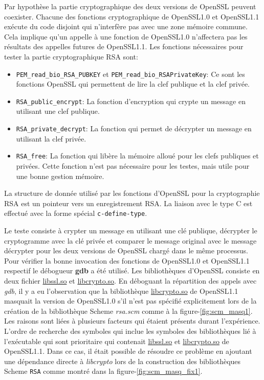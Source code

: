 Par hypothèse la partie cryptographique des deux versions de OpenSSL peuvent
coexister. Chacune des fonctions cryptographique de OpenSSL1.0 et OpenSSL1.1
exécute du code disjoint qui n'interfère pas avec une zone mémoire commune.
Cela implique qu'un appelle à une fonction de OpenSSL1.0 n'affectera pas les
résultats des appelles futures de OpenSSL1.1. Les fonctions nécessaires
pour tester la partie cryptographique RSA sont:
\begin{itemize}
    \item \lstinline{PEM_read_bio_RSA_PUBKEY} et \lstinline{PEM_read_bio_RSAPrivateKey}:
        Ce sont les fonctions OpenSSL qui permettent de lire la clef publique et la clef privée.
    \item \lstinline{RSA_public_encrypt}:
        La fonction d'encryption qui crypte un  message en utilisant une clef publique.
    \item \lstinline{RSA_private_decrypt}:
        La fonction qui permet de décrypter un message en utilisant la clef privée.
    \item \lstinline{RSA_free}:
        La fonction qui libère la mémoire alloué pour les clefs publiques et privées.
        Cette fonction n'est pas nécessaire pour les testes, mais utile pour une bonne
        gestion mémoire.
\end{itemize}
La structure de donnée utilisé par les fonctions d'OpenSSL pour la cryptographie RSA
est un pointeur vers un enregistrement RSA. La liaison avec le type C est effectué avec
la forme spécial \lstinline{c-define-type}.

Le teste consiste à crypter un message en utilisant une clé publique, décrypter le
cryptogramme avec la clé privée et comparer le message original avec le message décrypter
pour les deux versions de OpenSSL chargé dans le même processus. Pour vérifier la bonne
invocation des fonctions de OpenSSL1.0 et OpenSSL1.1 respectif le débogueur \textbf{gdb}
a été utilisé. Les bibliothèques d'OpenSSL consiste en deux fichier \url{libssl.so} et \url{libcrypto.so}.
En déboguant la répartition des appels avec \textit{gdb}, il y a eu l'observation que
la bibliothèque \url{libcrypto.so} de OpenSSL1.1 masquait la version de OpenSSL1.0 s'il
n'est pas spécifié explicitement lors de la création de la bibliothèque Scheme \textit{rsa.scm}
comme à la figure-\ref{fig:scm_masq1}. Les raisons sont liées à plusieurs facteurs qui étaient présents
durant l'expérience. L'ordre de recherche des symboles qui inclue les symboles des bibliothèques lié à
l'exécutable qui sont prioritaire qui contenait \url{libssl.so} et \url{libcrypto.so} de OpenSSL1.1.
Dans ce cas, il était possible de résoudre ce problème en ajoutant une
dépendance directe à \textit{libcrypto} lors de la construction des bibliothèques Scheme \verb+RSA+
comme montré dans la figure-\ref{fig:scm_masq_fix1}.

